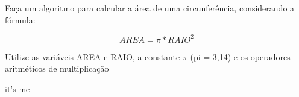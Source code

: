 
Faça um algoritmo para calcular a área de uma circunferência, considerando a fórmula:

\begin{equation}
AREA = \pi * RAIO^2
\end{equation}

Utilize as variáveis AREA e RAIO, a constante $\pi$ (pi = 3,14) e os operadores aritméticos de multiplicação

\begin{solution}
	it's me
\end{solution}

